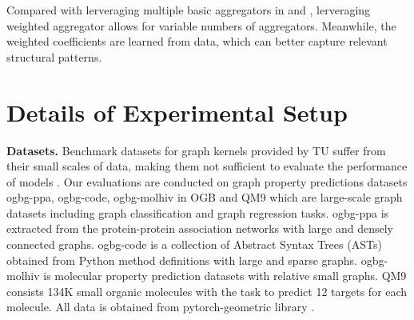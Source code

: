 \documentclass{article} \usepackage{iclr2021_conference,times}
\begin{document}
Compared with lerveraging multiple basic aggregators in \citep{corso2020principal} and \citep{dehmamy2019understanding}, lerveraging weighted aggregator allows for variable numbers of aggregators.
Meanwhile, the weighted coefficients are learned from data, which can better capture relevant structural patterns.


\section{Details of Experimental Setup}
\label{experiments-details}

\textbf{Datasets.}
Benchmark datasets for graph kernels provided by TU \citep{KKMMN2016} suffer from their small scales of data,
making them not sufficient to evaluate the performance of models \citep{dwivedi2020benchmarking}.
Our evaluations are conducted on graph property predictions datasets ogbg-ppa, ogbg-code, ogbg-molhiv in OGB \citep{hu2020ogb} and QM9 \citep{ramakrishnan2014quantum,wu2018moleculenet,ruddigkeit2012enumeration} which are large-scale graph datasets including graph classification and graph regression tasks.
ogbg-ppa is extracted from the protein-protein association networks with large and densely connected graphs.
ogbg-code is a collection of Abstract Syntax Trees (ASTs) obtained from Python method definitions with large and sparse graphs.
ogbg-molhiv is molecular property prediction datasets with relative small graphs.
QM9 consists 134K small organic molecules with the task to predict 12 targets for each molecule.
All data is obtained from pytorch-geometric library \citep{Fey/Lenssen/2019}.
\end{document}
